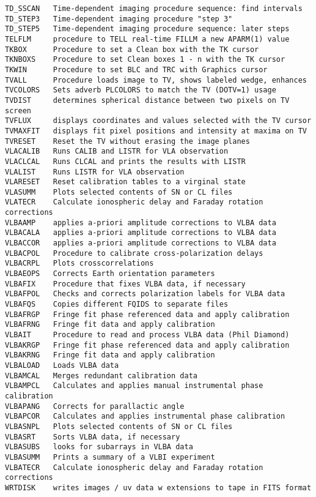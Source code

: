 \begin{verbatim}
TD_SSCAN   Time-dependent imaging procedure sequence: find intervals
TD_STEP3   Time-dependent imaging procedure "step 3"
TD_STEP5   Time-dependent imaging procedure sequence: later steps
TELFLM     procedure to TELL real-time FILLM a new APARM(1) value
TKBOX      Procedure to set a Clean box with the TK cursor
TKNBOXS    Procedure to set Clean boxes 1 - n with the TK cursor
TKWIN      Procedure to set BLC and TRC with Graphics cursor
TVALL      Procedure loads image to TV, shows labeled wedge, enhances
TVCOLORS   Sets adverb PLCOLORS to match the TV (DOTV=1) usage
TVDIST     determines spherical distance between two pixels on TV screen
TVFLUX     displays coordinates and values selected with the TV cursor
TVMAXFIT   displays fit pixel positions and intensity at maxima on TV
TVRESET    Reset the TV without erasing the image planes
VLACALIB   Runs CALIB and LISTR for VLA observation
VLACLCAL   Runs CLCAL and prints the results with LISTR
VLALIST    Runs LISTR for VLA observation
VLARESET   Reset calibration tables to a virginal state
VLASUMM    Plots selected contents of SN or CL files
VLATECR    Calculate ionospheric delay and Faraday rotation corrections
VLBAAMP    applies a-priori amplitude corrections to VLBA data
VLBACALA   applies a-priori amplitude corrections to VLBA data
VLBACCOR   applies a-priori amplitude corrections to VLBA data
VLBACPOL   Procedure to calibrate cross-polarization delays
VLBACRPL   Plots crosscorrelations
VLBAEOPS   Corrects Earth orientation parameters
VLBAFIX    Procedure that fixes VLBA data, if necessary
VLBAFPOL   Checks and corrects polarization labels for VLBA data
VLBAFQS    Copies different FQIDS to separate files
VLBAFRGP   Fringe fit phase referenced data and apply calibration
VLBAFRNG   Fringe fit data and apply calibration
VLBAIT     Procedure to read and process VLBA data (Phil Diamond)
VLBAKRGP   Fringe fit phase referenced data and apply calibration
VLBAKRNG   Fringe fit data and apply calibration
VLBALOAD   Loads VLBA data
VLBAMCAL   Merges redundant calibration data
VLBAMPCL   Calculates and applies manual instrumental phase calibration
VLBAPANG   Corrects for parallactic angle
VLBAPCOR   Calculates and applies instrumental phase calibration
VLBASNPL   Plots selected contents of SN or CL files
VLBASRT    Sorts VLBA data, if necessary
VLBASUBS   looks for subarrays in VLBA data
VLBASUMM   Prints a summary of a VLBI experiment
VLBATECR   Calculate ionospheric delay and Faraday rotation corrections
WRTDISK    writes images / uv data w extensions to tape in FITS format
\end{verbatim}\eve

